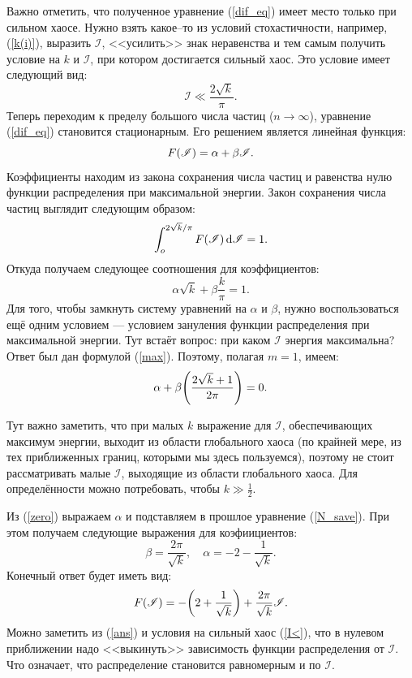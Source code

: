 \documentclass[a4paper,9pt,russian]{article}
\newcommand{\I}{\mathscr{I}}
\renewcommand{\-}{\bar}
\begin{document}
Важно отметить, что полученное уравнение (\ref{dif_eq}) имеет место только при сильном 
хаосе. Нужно взять какое--то из условий стохастичности, например, (\ref{k(i)}), выразить $\I$, <<усилить>> знак неравенства и тем самым получить условие на  $k$ и  $\I$, при котором достигается сильный хаос. Это условие имеет следующий вид:
 \begin{equation}\label{I<}
 \I \ll \frac{2\sqrt{k} }{\pi}	 .
\end{equation}
Теперь переходим к пределу большого числа частиц ($n \rightarrow \infty$), уравнение (\ref{dif_eq}) становится стационарным. Его решением является линейная функция:
\[
F\qty(\I) = \alpha+\beta\I
.\] 
Коэффициенты находим из закона сохранения числа частиц и равенства нулю функции распределения при максимальной энергии. Закон сохранения числа частиц выглядит следующим образом:
\begin{equation*}
	\int_{o}^{{2\sqrt{k}}/{\pi}}F\qty(\I)\dd{\I} = 1.  
\end{equation*}
Откуда получаем следующее соотношения для коэффициентов:
\begin{equation}\label{N_save}
\alpha {\sqrt{k}} + \beta \frac{k}{\pi} = 1
.
\end{equation}
Для того, чтобы замкнуть систему уравнений на $\alpha$ и  $\beta$, нужно воспользоваться ещё одним условием --- условием зануления функции распределения при максимальной энергии. Тут встаёт вопрос: при каком $\I$ энергия максимальна? Ответ был дан формулой (\ref{max}). Поэтому, полагая $m=1$, имеем:
\begin{equation}\label{zero}
\alpha+\beta\qty(\frac{2\sqrt{k}+1 }{2\pi})=0
.
\end{equation}
\par
Тут важно заметить, что при малых $k$ выражение для  $\I$, обеспечивающих максимум энергии, выходит из области глобального хаоса (по крайней мере, из тех приближенных границ, которыми мы здесь пользуемся), поэтому не стоит рассматривать малые $\I$, выходящие из области глобального хаоса. Для определённости можно потребовать, чтобы $k\gg \frac{1}{2} $.
\par
Из (\ref{zero}) выражаем $\alpha$ и подставляем в прошлое уравнение (\ref{N_save}). При этом получаем следующие выражения для коэфиициентов:
\[
\beta=\frac{2\pi}{\sqrt{k} },\quad \alpha = -2-\frac{1}{\sqrt{k} } 
.\] 
Конечный ответ будет иметь вид:
\begin{equation}\label{ans}
F\qty(\I)= -\qty(2+\frac{1}{\sqrt{k} }) + \frac{2\pi}{\sqrt{k} } \I
.
\end{equation}
Можно заметить из (\ref{ans}) и условия на сильный хаос (\ref{I<}), что в нулевом приближении надо <<выкинуть>> зависимость функции распределения от $\I$. Что означает, что распределение становится равномерным и по $\I$.
\end{document}
